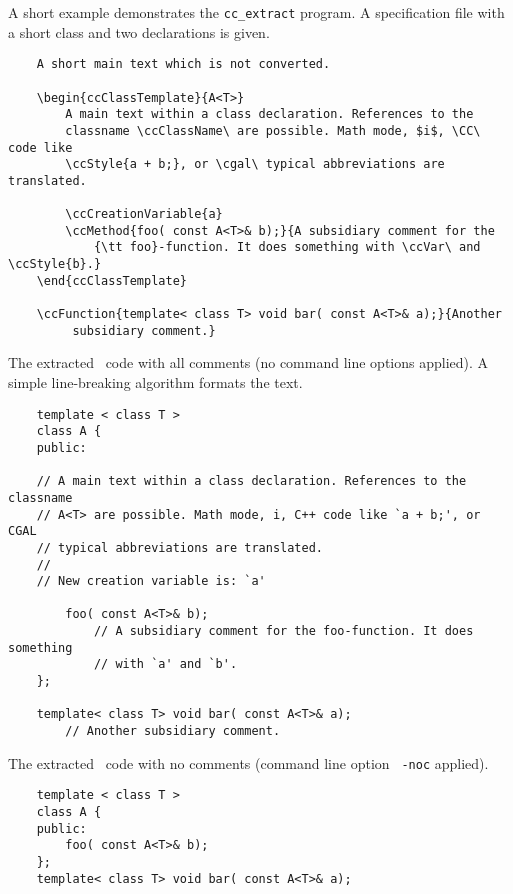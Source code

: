 \documentclass[12pt]{article}
\begin{document}
A short example demonstrates the {\tt cc\_extract} program. A
specification file with a short class and two declarations is given.

{\footnotesize
\begin{verbatim}
    A short main text which is not converted.

    \begin{ccClassTemplate}{A<T>}
        A main text within a class declaration. References to the
        classname \ccClassName\ are possible. Math mode, $i$, \CC\ code like
        \ccStyle{a + b;}, or \cgal\ typical abbreviations are translated.

        \ccCreationVariable{a}
        \ccMethod{foo( const A<T>& b);}{A subsidiary comment for the 
            {\tt foo}-function. It does something with \ccVar\ and \ccStyle{b}.} 
    \end{ccClassTemplate}

    \ccFunction{template< class T> void bar( const A<T>& a);}{Another
         subsidiary comment.}
\end{verbatim}
}

The extracted \CC\ code with all comments (no command line options applied).
A simple line-breaking algorithm formats the text.

{\footnotesize
\begin{verbatim}
    template < class T >
    class A {
    public:

    // A main text within a class declaration. References to the classname
    // A<T> are possible. Math mode, i, C++ code like `a + b;', or CGAL
    // typical abbreviations are translated.
    // 
    // New creation variable is: `a'

        foo( const A<T>& b);
            // A subsidiary comment for the foo-function. It does something
            // with `a' and `b'.
    };

    template< class T> void bar( const A<T>& a);
        // Another subsidiary comment.
\end{verbatim}
}

The extracted \CC\ code with no comments (command line option {\tt
  -noc}  applied).

{\footnotesize
\begin{verbatim}
    template < class T >
    class A {
    public:
        foo( const A<T>& b);
    };
    template< class T> void bar( const A<T>& a);
\end{verbatim}
}

\end{document}
